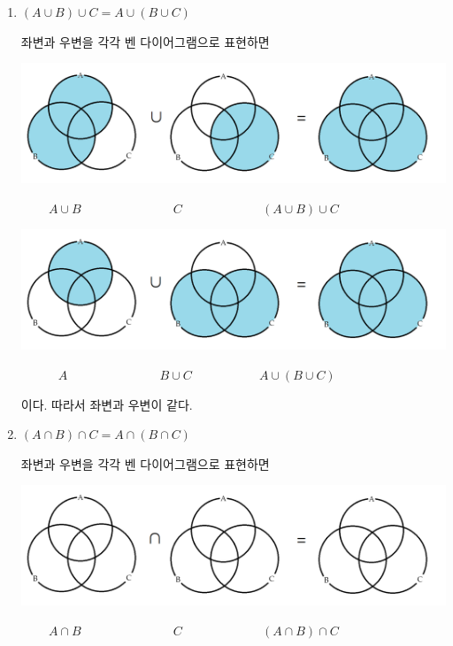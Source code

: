 \documentclass{oblivoir}
\begin{document}
\newpage
%
\begin{enumerate}\label{properties3}
\item
\((A\cup B)\cup C=A\cup(B\cup C)\)
\begin{mdframed}
좌변과 우변을 각각 벤 다이어그램으로 표현하면
\par
\includegraphics[width=.9\textwidth]{properties_3-1}
\par\vspace{-10pt}
\(\qquad\:A\cup B\qquad\qquad\qquad\quad\:\:C
\qquad\qquad\qquad\:\:(A\cup B)\cup C\)
\par
\includegraphics[width=.9\textwidth]{properties_3-2}
\par\vspace{-10pt}
\(\qquad\quad A\qquad\qquad\qquad\quad\:\:B\cup C
\qquad\qquad\quad\:\: A\cup (B\cup C)\)
\par
이다.
따라서 좌변과 우변이 같다.
\end{mdframed}
\item
\((A\cap B)\cap C=A\cap(B\cap C)\)
\begin{mdframed}
좌변과 우변을 각각 벤 다이어그램으로 표현하면
\par
\includegraphics[width=.9\textwidth]{three_set_rule_cap}
\par\vspace{-10pt}
\(\qquad\:A\cap B\qquad\qquad\qquad\quad\:\:C
\qquad\qquad\qquad\:\:(A\cap B)\cap C\)
\par

\end{mdframed}
\end{enumerate}
\end{document}
